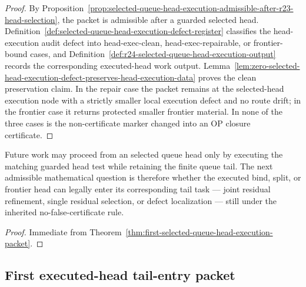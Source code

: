 \begin{proof}
By Proposition~\ref{prop:selected-queue-head-execution-admissible-after-r23-head-selection}, the packet is admissible after a guarded selected head. Definition~\ref{def:selected-queue-head-execution-defect-register} classifies the head-execution audit defect into head-exec-clean, head-exec-repairable, or frontier-bound cases, and Definition~\ref{def:r24-selected-queue-head-execution-output} records the corresponding executed-head work output. Lemma~\ref{lem:zero-selected-head-execution-defect-preserves-head-execution-data} proves the clean preservation claim. In the repair case the packet remains at the selected-head execution node with a strictly smaller local execution defect and no route drift; in the frontier case it returns protected smaller frontier material. In none of the three cases is the non-certificate marker changed into an OP closure certificate.
\end{proof}

\begin{corollary}
\label{cor:v3340-r24-working-rule}
Future work may proceed from an selected queue head only by executing the matching guarded head test while retaining the finite queue tail. The next admissible mathematical question is therefore whether the executed bind, split, or frontier head can legally enter its corresponding tail task --- joint residual refinement, single residual selection, or defect localization --- still under the inherited no-false-certificate rule.
\end{corollary}

\begin{proof}
Immediate from Theorem~\ref{thm:first-selected-queue-head-execution-packet}.
\end{proof}
\subsection{First executed-head tail-entry packet}
\label{subsec:first-executed-head-tail-entry-packet}

